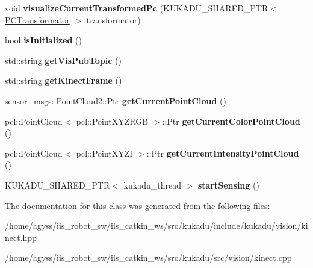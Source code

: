 \begin{DoxyCompactItemize}
\item 
void {\bfseries visualize\+Current\+Transformed\+Pc} (K\+U\+K\+A\+D\+U\+\_\+\+S\+H\+A\+R\+E\+D\+\_\+\+P\+TR$<$ \hyperlink{classkukadu_1_1PCTransformator}{P\+C\+Transformator} $>$ transformator)\hypertarget{classkukadu_1_1Kinect_aa944fc517785fb7016b21c3702647561}{}\label{classkukadu_1_1Kinect_aa944fc517785fb7016b21c3702647561}

\item 
bool {\bfseries is\+Initialized} ()\hypertarget{classkukadu_1_1Kinect_a7ae4121c9bb011af3d3c7f46165959e2}{}\label{classkukadu_1_1Kinect_a7ae4121c9bb011af3d3c7f46165959e2}

\item 
std\+::string {\bfseries get\+Vis\+Pub\+Topic} ()\hypertarget{classkukadu_1_1Kinect_a52f8d2b28a3b994500a5786e3dba5cab}{}\label{classkukadu_1_1Kinect_a52f8d2b28a3b994500a5786e3dba5cab}

\item 
std\+::string {\bfseries get\+Kinect\+Frame} ()\hypertarget{classkukadu_1_1Kinect_a3e73a0f24450d1de66b81a1daea0c845}{}\label{classkukadu_1_1Kinect_a3e73a0f24450d1de66b81a1daea0c845}

\item 
sensor\+\_\+msgs\+::\+Point\+Cloud2\+::\+Ptr {\bfseries get\+Current\+Point\+Cloud} ()\hypertarget{classkukadu_1_1Kinect_ae898d9ad359df5712b6c002c21697ed8}{}\label{classkukadu_1_1Kinect_ae898d9ad359df5712b6c002c21697ed8}

\item 
pcl\+::\+Point\+Cloud$<$ pcl\+::\+Point\+X\+Y\+Z\+R\+GB $>$\+::Ptr {\bfseries get\+Current\+Color\+Point\+Cloud} ()\hypertarget{classkukadu_1_1Kinect_a563431a4eec6ce76af8d16b2610fba87}{}\label{classkukadu_1_1Kinect_a563431a4eec6ce76af8d16b2610fba87}

\item 
pcl\+::\+Point\+Cloud$<$ pcl\+::\+Point\+X\+Y\+ZI $>$\+::Ptr {\bfseries get\+Current\+Intensity\+Point\+Cloud} ()\hypertarget{classkukadu_1_1Kinect_a28ec9c63f657db4bf230bbb954ef2f64}{}\label{classkukadu_1_1Kinect_a28ec9c63f657db4bf230bbb954ef2f64}

\item 
K\+U\+K\+A\+D\+U\+\_\+\+S\+H\+A\+R\+E\+D\+\_\+\+P\+TR$<$ kukadu\+\_\+thread $>$ {\bfseries start\+Sensing} ()\hypertarget{classkukadu_1_1Kinect_accb63ddb5e6024124d575e7fe229c429}{}\label{classkukadu_1_1Kinect_accb63ddb5e6024124d575e7fe229c429}

\end{DoxyCompactItemize}


The documentation for this class was generated from the following files\+:\begin{DoxyCompactItemize}
\item 
/home/agyss/iis\+\_\+robot\+\_\+sw/iis\+\_\+catkin\+\_\+ws/src/kukadu/include/kukadu/vision/kinect.\+hpp\item 
/home/agyss/iis\+\_\+robot\+\_\+sw/iis\+\_\+catkin\+\_\+ws/src/kukadu/src/vision/kinect.\+cpp\end{DoxyCompactItemize}
